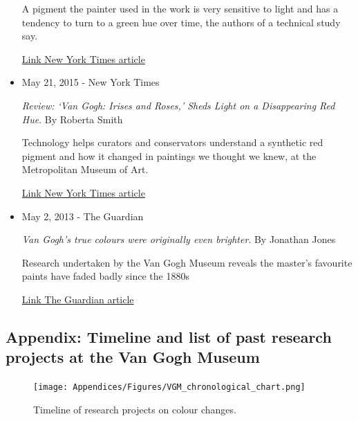 \begin{appendices}
\begin{itemize}
    A pigment the painter used in the work is very sensitive to light and has a tendency to turn to a green hue over time, the authors of a technical study say.
        
    \href{https://www.nytimes.com/2018/06/01/arts/design/van-gogh-yellow-sunflowers.html}{Link New York Times article}\\


    \item May 21, 2015 - New York Times   
    
    \textit{Review: ‘Van Gogh: Irises and Roses,’ Sheds Light on a Disappearing Red Hue}. By Roberta Smith
    
    Technology helps curators and conservators understand a synthetic red pigment and how it changed in paintings we thought we knew, at the Metropolitan Museum of Art.    
  
    \href{https://www.nytimes.com/2015/05/22/arts/design/review-van-gogh-irises-and-roses-sheds-light-on-a-disappearing-red-hue.html}{Link New York Times article}\\

    
    \item May 2, 2013 - The Guardian

    \textit{Van Gogh's true colours were originally even brighter}. By Jonathan Jones

    Research undertaken by the Van Gogh Museum reveals the master's favourite paints have faded badly since the 1880s

    \href{https://www.theguardian.com/artanddesign/jonathanjonesblog/2013/may/02/van-gogh-original-colours-brighter}{Link The Guardian article}

\end{itemize}



\begin{landscape}
\newpage
\section[\hspace{0.3cm}Timeline and list of past research projects at the Van Gogh Museum]{ Appendix: Timeline and list of past research projects at the Van Gogh Museum}
\label{app:ch1_timeline_VGM-projects}

\vspace{5cm}

\begin{figure}[!h]
\centering
\texttt{[image: Appendices/Figures/VGM\_chronological\_chart.png]}
\caption*{Timeline of research projects on colour changes.}
\end{figure}  


\end{landscape}
\end{appendices}
